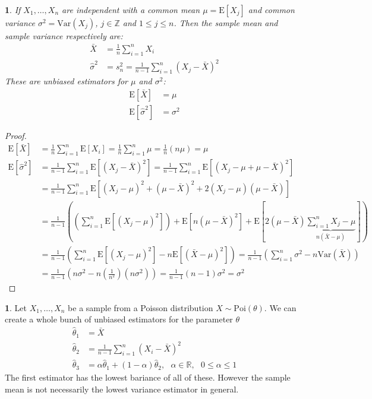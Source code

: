 \documentclass[english,12pt]{article}
\theoremstyle{plain}
\newtheorem*{theorem}{\protect\theoremname}
\theoremstyle{definition}
\newtheorem*{example}{\protect\examplename}
\theoremstyle{definition} %
\providecommand{\theoremname}{Theorem}
\providecommand{\examplename}{Example}
\newcommand{\ex}[1]{\mbox{E} \left[ #1 \right]}
\newcommand{\var}[1]{\mbox{Var} \left( #1 \right)}
\begin{document}
\begin{theorem}
If $X_1,\ldots,X_n$ are independent with a common mean $\mu=\ex{X_j}$ and common variance $\sigma^2=\var{X_j}$, $j\in\mathbb{Z}$ and $1\le j\le n$.  Then the sample mean and sample variance respectively are:
\begin{align*}
\bar{X}&=\frac{1}{n}\sum\limits_{i=1}^nX_i\\
\hat{\sigma}^2&=s_n^2=\frac{1}{n-1}\sum\limits_{i=1}^n(X_j-\bar{X})^2
\end{align*}
These are unbiased estimators for $\mu$ and $\sigma^2$:
\begin{align*}
\ex{\bar{X}}&=\mu\\
\ex{\hat{\sigma}^2}&=\sigma^2
\end{align*}
\end{theorem}

\begin{proof}
\begin{align*}
\ex{\bar{X}}&=\frac{1}{n}\sum\limits_{i=1}^n\ex{X_i}
=\frac{1}{n}\sum\limits_{i=1}^n\mu
=\frac{1}{n}(n\mu)
=\mu\\
\ex{\hat{\sigma}^2}&=\frac{1}{n-1}\sum\limits_{i=1}^n\ex{(X_j-\bar{X})^2}
=\frac{1}{n-1}\sum\limits_{i=1}^n\ex{(X_j-\mu+\mu-\bar{X})^2}\\
&=\frac{1}{n-1}\sum\limits_{i=1}^n\ex{(X_j-\mu)^2+(\mu-\bar{X})^2+2(X_j-\mu)(\mu-\bar{X})}\\
&=\frac{1}{n-1}\left(\left(\sum\limits_{i=1}^n\ex{(X_j-\mu)^2}\right)+\ex{n(\mu-\bar{X})^2}+\ex{2(\mu-\bar{X})\underbrace{\sum\limits_{i=1}^nX_j-\mu}_{n(\bar{X}-\mu)}}\right)\\
&=\frac{1}{n-1}\left(\sum\limits_{i=1}^n\ex{(X_j-\mu)^2}-n\ex{(\bar{X}-\mu)^2}\right)
=\frac{1}{n-1}\left(\sum\limits_{i=1}^n\sigma^2-n\var{\bar{X}}\right)\\
&=\frac{1}{n-1}\left(n\sigma^2-n\left(\frac{1}{n^2}\right)(n\sigma^2)\right)
=\frac{1}{n-1}(n-1)\sigma^2
=\sigma^2
\end{align*}
\end{proof}

\begin{example}
Let $X_1,\ldots,X_n$ be a sample from a Poisson distribution $X\sim \text{Poi}(\theta)$.  We can create a whole bunch of unbiased estimators for the parameter $\theta$
\begin{align*}
\hat\theta_1&=\bar{X}\\
\hat\theta_2&=\frac{1}{n-1}\sum\limits_{i=1}^n(X_i-\bar{X})^2\\
\hat\theta_3&=\alpha\hat\theta_1+(1-\alpha)\hat\theta_2, \text{ }\alpha\in\mathbb{R},\text{ }0\le\alpha\le 1 
\end{align*}
The first estimator has the lowest bariance of all of these.  However the sample mean is not necessarily the lowest variance estimator in general.
\end{example}
\end{document}
